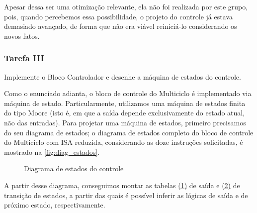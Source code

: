 \documentclass[a4paper,12pt]{article}
\begin{document}
Apesar dessa ser uma otimização relevante, ela não foi realizada por este grupo, pois, quando percebemos essa possibilidade, o projeto do controle já estava demasiado avançado, de forma que não era viável reiniciá-lo considerando os novos fatos.

\newpage

\subsubsection{Tarefa III}
\begin{tcolorbox}[title=Enunciado, colback=blue!5!white, colframe=blue!75!black]

Implemente o Bloco Controlador e desenhe a máquina de estados do controle. 
\end{tcolorbox}
Como o enunciado adianta, o bloco de controle do Multiciclo é implementado via máquina de estado. Particularmente, utilizamos uma máquina de estados finita do tipo Moore (isto é, em que a saída depende exclusivamente do estado atual, não das entradas). Para projetar uma máquina de estados, primeiro precisamos do seu diagrama de estados; o diagrama de estados completo do bloco de controle do Multiciclo com ISA reduzida, considerando as doze instruções solicitadas, é mostrado na \autoref{fig:diag_estados}.

\begin{figure}[H]
    \centering
    
    \vspace{-15pt}
    \caption{Diagrama de estados do controle}
    \label{fig:diag_estados}
\end{figure}

A partir desse diagrama, conseguimos montar as tabelas \hyperref[tab:saidas]{(1)} de saída e \hyperref[tab:tran_estados]{(2)} de transição de estados, a partir das quais é possível inferir as lógicas de saída e de próximo estado, respectivamente.
\end{document}
